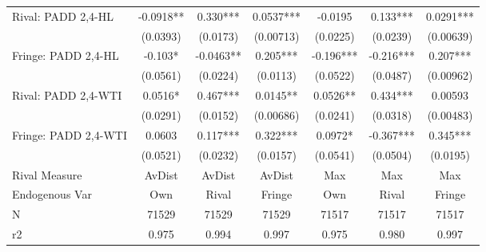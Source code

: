 {\begin{tabular}{l*{6}{c}}
\addlinespace
Rival: PADD 2,4-HL&  -0.0918** &    0.330***&   0.0537***&  -0.0195   &    0.133***&   0.0291***\\
                & (0.0393)   & (0.0173)   &(0.00713)   & (0.0225)   & (0.0239)   &(0.00639)   \\
\addlinespace
Fringe: PADD 2,4-HL&   -0.103*  &  -0.0463** &    0.205***&   -0.196***&   -0.216***&    0.207***\\
                & (0.0561)   & (0.0224)   & (0.0113)   & (0.0522)   & (0.0487)   &(0.00962)   \\
\addlinespace
Rival: PADD 2,4-WTI&   0.0516*  &    0.467***&   0.0145** &   0.0526** &    0.434***&  0.00593   \\
                & (0.0291)   & (0.0152)   &(0.00686)   & (0.0241)   & (0.0318)   &(0.00483)   \\
\addlinespace
Fringe: PADD 2,4-WTI&   0.0603   &    0.117***&    0.322***&   0.0972*  &   -0.367***&    0.345***\\
                & (0.0521)   & (0.0232)   & (0.0157)   & (0.0541)   & (0.0504)   & (0.0195)   \\
\midrule
Rival Measure   &   AvDist   &   AvDist   &   AvDist   &      Max   &      Max   &      Max   \\
Endogenous Var  &      Own   &    Rival   &   Fringe   &      Own   &    Rival   &   Fringe   \\
N               &    71529   &    71529   &    71529   &    71517   &    71517   &    71517   \\
r2              &    0.975   &    0.994   &    0.997   &    0.975   &    0.980   &    0.997   \\
\bottomrule
\end{tabular}
}
